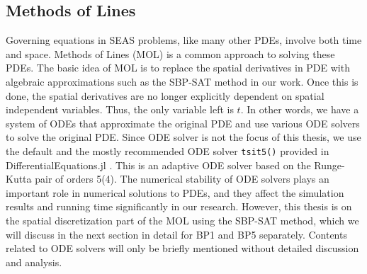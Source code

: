 \subsection{Methods of Lines}
Governing equations in SEAS problems, like many other PDEs, involve both time and space.
Methods of Lines (MOL) is a common approach to solving these PDEs.
The basic idea of MOL is to replace the spatial derivatives in PDE with algebraic approximations such as the SBP-SAT method in our work.
Once this is done, the spatial derivatives are no longer explicitly dependent on spatial independent variables.
Thus, the only variable left is $t$.
In other words, we have a system of ODEs that approximate the original PDE and use various ODE solvers to solve the original PDE.
Since ODE solver is not the focus of this thesis, we use the default and the mostly recommended ODE solver \texttt{tsit5()} provided in DifferentialEquations.jl \cite{TSITOURAS2011770}.
This is an adaptive ODE solver based on the Runge-Kutta pair of orders 5(4).
The numerical stability of ODE solvers plays an important role in numerical solutions to PDEs, and they affect the simulation results and running time significantly in our research. 
However, this thesis is on the spatial discretization part of the MOL using the SBP-SAT method, which we will discuss in the next section in detail for BP1 and BP5 separately.
Contents related to ODE solvers will only be briefly mentioned without detailed discussion and analysis.
